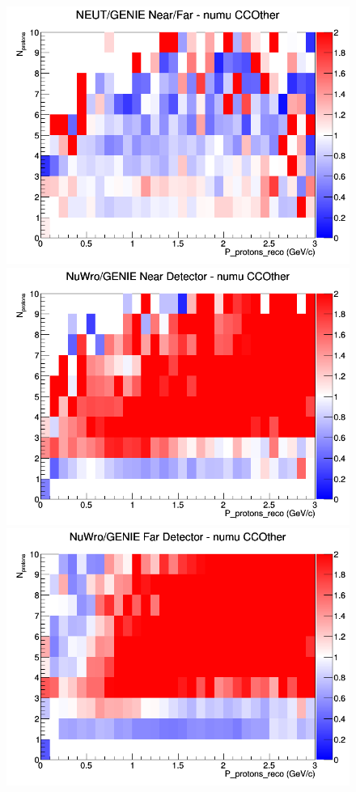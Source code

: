 \begin{figure}[h]
\endminipage
{}
\includegraphics[width=\linewidth]{eff_N_P/FGT/protons/ratios/CCOther_NEUT_GENIE_numu_NF_N_P.png}
\endminipage
\newline
{}
\includegraphics[width=\linewidth]{eff_N_P/FGT/protons/ratios/CCOther_NuWro_GENIE_numu_near_N_P.png}
\endminipage
{}
\includegraphics[width=\linewidth]{eff_N_P/FGT/protons/ratios/CCOther_NuWro_GENIE_numu_far_N_P.png}

\end{figure}

